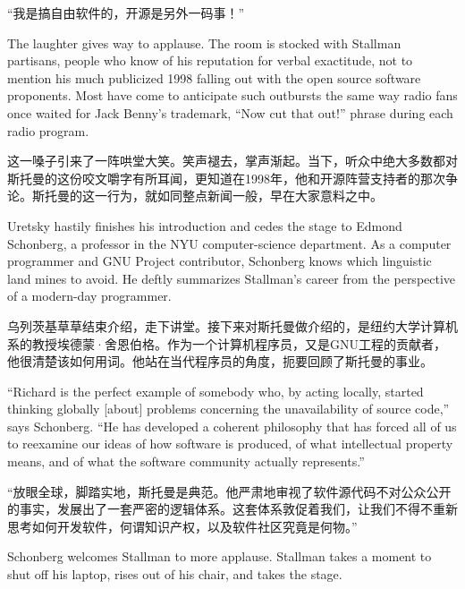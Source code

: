 \ifdefined\chs
“我是搞自由软件的，开源是另外一码事！”
\fi

\ifdefined\eng
The laughter gives way to applause. The room is stocked with Stallman partisans, people who know of his reputation for verbal exactitude, not to mention his much publicized 1998 falling out with the open source software proponents. Most have come to anticipate such outbursts the same way radio fans once waited for Jack Benny's trademark, ``Now cut that out!'' phrase during each radio program.
\fi

\ifdefined\chs
这一嗓子引来了一阵哄堂大笑。笑声褪去，掌声渐起。当下，听众中绝大多数都对斯托曼的这份咬文嚼字有所耳闻，更知道在1998年，他和开源阵营支持者的那次争论。斯托曼的这一行为，就如同整点新闻一般，早在大家意料之中。
\fi

\ifdefined\eng
Uretsky hastily finishes his introduction and cedes the stage to Edmond Schonberg, a professor in the NYU computer-science department. As a computer programmer and GNU Project contributor, Schonberg knows which linguistic land mines to avoid. He deftly summarizes Stallman's career from the perspective of a modern-day programmer.
\fi

\ifdefined\chs
乌列茨基草草结束介绍，走下讲堂。接下来对斯托曼做介绍的，是纽约大学计算机系的教授埃德蒙·舍恩伯格。作为一个计算机程序员，又是GNU工程的贡献者，他很清楚该如何用词。他站在当代程序员的角度，扼要回顾了斯托曼的事业。
\fi

\ifdefined\eng
``Richard is the perfect example of somebody who, by acting locally, started thinking globally [about] problems concerning the unavailability of source code,'' says Schonberg. ``He has developed a coherent philosophy that has forced all of us to reexamine our ideas of how software is produced, of what intellectual property means, and of what the software community actually represents.''
\fi

\ifdefined\chs
“放眼全球，脚踏实地，斯托曼是典范。他严肃地审视了软件源代码不对公众公开的事实，发展出了一套严密的逻辑体系。这套体系敦促着我们，让我们不得不重新思考如何开发软件，何谓知识产权，以及软件社区究竟是何物。”
\fi

\ifdefined\eng
Schonberg welcomes Stallman to more applause. Stallman takes a moment to shut off his laptop, rises out of his chair, and takes the stage.
\fi

